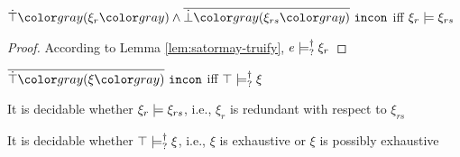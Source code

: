 \begin{thm}
  \label{lem:inconsistency-and-redundancy}
  $\cincon{\cand{\ctruify{\xi_r}}{\cdual{\cfalsify{\xi_{rs}}}}}$ iff $\xi_r \models \xi_{rs}$
\end{thm}
\begin{proof}
  According to Lemma \ref{lem:satormay-truify}, $e \models_{?}^{\dag} \xi_r$
\end{proof}

\begin{thm}
  \label{lem:inconsistency-and-exhaustiveness}
  $\cincon{\cdual{\ctruify{\xi}}}$ iff $\top \models_{?}^{\dag} \xi$
\end{thm}

\begin{thm}
  \label{lem:redundancy-decidability}
  It is decidable whether $\xi_r \models \xi_{rs}$, i.e., $\xi_r$ is redundant with respect to $\xi_{rs}$
\end{thm}

\begin{thm}
  \label{lem:exhaustiveness-decidability}
  It is decidable whether $\top \models_{?}^{\dag} \xi$, i.e., $\xi$ is exhaustive or $\xi$ is possibly exhaustive
\end{thm}
